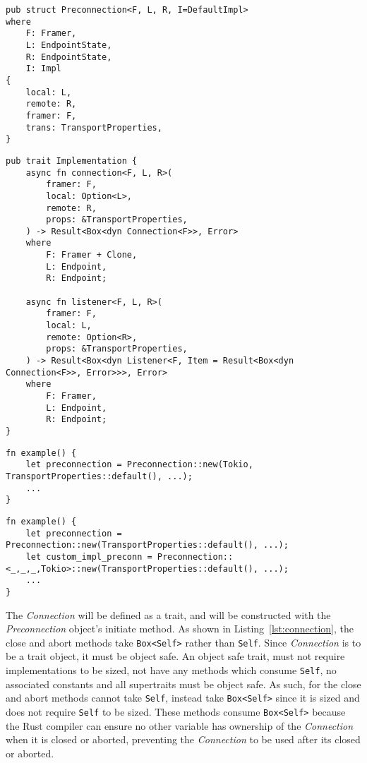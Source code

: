 \begin{lstlisting}[float=h, label=lst:preconnection, caption={The Preconnection struct, showing the four
    generic parameters.}]
pub struct Preconnection<F, L, R, I=DefaultImpl>
where
    F: Framer,
    L: EndpointState,
    R: EndpointState,
    I: Impl
{
    local: L,
    remote: R,
    framer: F,
    trans: TransportProperties,
}
\end{lstlisting}

\begin{lstlisting}[float=h, label=lst:impl, caption={The Implementation trait.}]
pub trait Implementation {
    async fn connection<F, L, R>(
        framer: F,
        local: Option<L>,
        remote: R,
        props: &TransportProperties,
    ) -> Result<Box<dyn Connection<F>>, Error>
    where
        F: Framer + Clone,
        L: Endpoint,
        R: Endpoint;

    async fn listener<F, L, R>(
        framer: F,
        local: L,
        remote: Option<R>,
        props: &TransportProperties,
    ) -> Result<Box<dyn Listener<F, Item = Result<Box<dyn Connection<F>>, Error>>>, Error>
    where
        F: Framer,
        L: Endpoint,
        R: Endpoint;
}
\end{lstlisting}

\begin{lstlisting}[float=h, label=lst:preconnBad, caption={An example of how to construct a
Preconnection if the Implementation trait is to be passed when the Preconnection is constructed}]
fn example() {
    let preconnection = Preconnection::new(Tokio, TransportProperties::default(), ...);
    ...
}
\end{lstlisting}

\begin{lstlisting}[float=h, label=lst:preconnGood, caption={An example of how to construct a
    Preconnection if the Implementation trait is used as a marker.}]
fn example() {
    let preconnection = Preconnection::new(TransportProperties::default(), ...);
    let custom_impl_preconn = Preconnection::<_,_,_,Tokio>::new(TransportProperties::default(), ...);
    ...
}
\end{lstlisting}

The \emph{Connection} will be defined as a trait, and will be constructed with the \emph{Preconnection} object's
initiate method.
As shown in Listing~\ref{lst:connection}, the close and abort methods take \texttt{Box<Self>} rather than \texttt{Self}.
Since \emph{Connection} is to be a trait object, it must be object safe.
An object safe trait, must not require implementations to be sized, not have any methods which consume \texttt{Self}, no
associated constants and all supertraits must be object safe.
As such, for the close and abort methods cannot take \texttt{Self}, instead take \texttt{Box<Self>} since it is sized
and does not require \texttt{Self} to be sized.
These methods consume \texttt{Box<Self>} because the Rust compiler can ensure no other variable has ownership of the
\emph{Connection} when it is closed or aborted, preventing the \emph{Connection} to be used after its closed or aborted.

